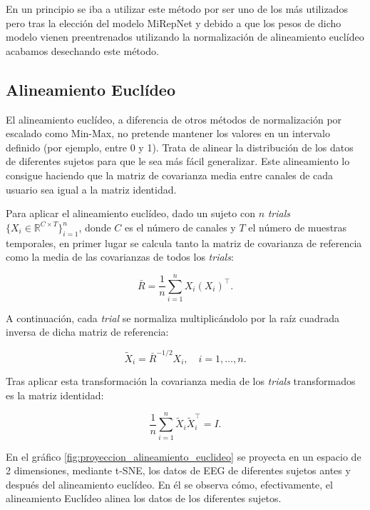 En un principio se iba a utilizar este método por ser uno de los más utilizados pero tras la elección del modelo MiRepNet y debido a que los pesos de dicho modelo vienen preentrenados utilizando la normalización de alineamiento euclídeo acabamos desechando este método.

\subsection{Alineamiento Euclídeo}
\label{subsec:alineamiento_euclideo}

El alineamiento euclídeo, a diferencia de otros métodos de normalización por escalado como Min-Max, no pretende mantener los valores en un intervalo definido (por ejemplo, entre 0 y 1). 
Trata de alinear la distribución de los datos de diferentes sujetos para que le sea más fácil generalizar. Este alineamiento lo consigue haciendo que la matriz de covarianza media entre canales de cada usuario sea igual a la matriz identidad.

Para aplicar el alineamiento euclídeo, dado un sujeto con $n$ \textit{trials} $\{X_i \in \mathbb{R}^{C \times T}\}_{i=1}^{n}$, donde $C$ es el número de canales y $T$ el número de muestras temporales, en primer lugar se calcula tanto la matriz de covarianza de referencia como la media de las covarianzas de todos los \textit{trials}:

\begin{equation}
    \bar{R} = \frac{1}{n} \sum_{i=1}^{n} X_i(X_i)^\top.
\end{equation}

A continuación, cada \textit{trial} se normaliza multiplicándolo por la raíz cuadrada inversa de dicha matriz de referencia:

\begin{equation}
    \tilde{X}_i = \bar{R}^{-1/2} X_i, \quad i = 1, \ldots, n.
\end{equation}

Tras aplicar esta transformación la covarianza media de los \textit{trials} transformados es la matriz identidad:

\begin{equation}
    \frac{1}{n} \sum_{i=1}^{n} \tilde{X}_i \tilde{X}_i^\top = I.
\end{equation}

En el gráfico \ref{fig:proyeccion_alineamiento_euclideo} se proyecta en un espacio de 2 dimensiones, mediante t-SNE, los datos de EEG de diferentes sujetos antes y después del alineamiento euclídeo. En él se observa cómo, efectivamente, el alineamiento Euclídeo alinea los datos de los diferentes sujetos.

